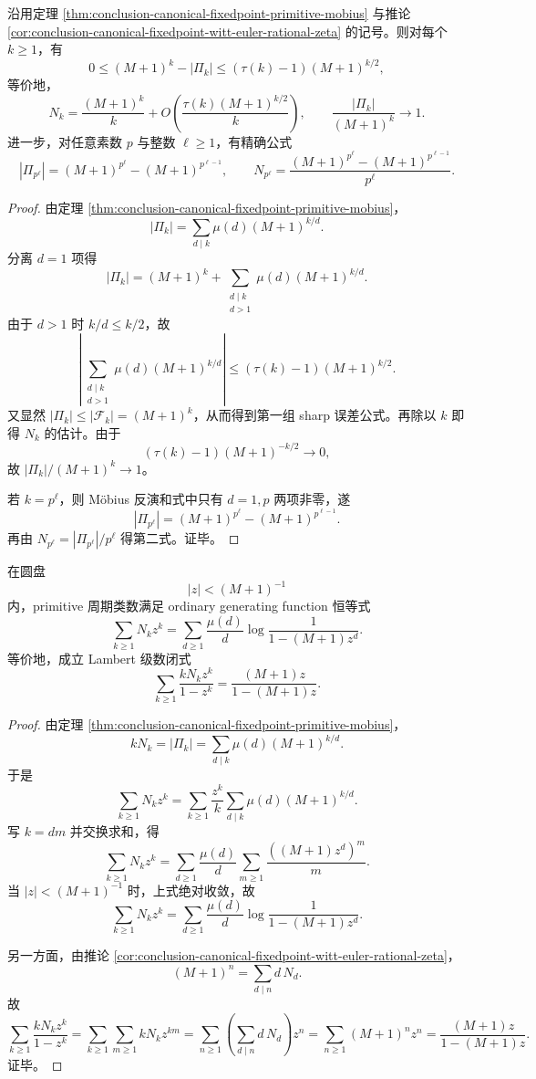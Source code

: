 \begin{theorem}\label{thm:conclusion-canonical-fixedpoint-primitive-sharp-error-primepower}
沿用定理 \ref{thm:conclusion-canonical-fixedpoint-primitive-mobius} 与推论 \ref{cor:conclusion-canonical-fixedpoint-witt-euler-rational-zeta} 的记号。则对每个 \(k\ge 1\)，有
\[
0\le (M+1)^k-|\Pi_k|
\le (\tau(k)-1)(M+1)^{k/2},
\]
等价地，
\[
N_k=\frac{(M+1)^k}{k}
+O\!\left(\frac{\tau(k)(M+1)^{k/2}}{k}\right),
\qquad
\frac{|\Pi_k|}{(M+1)^k}\longrightarrow 1.
\]
进一步，对任意素数 \(p\) 与整数 \(\ell\ge 1\)，有精确公式
\[
|\Pi_{p^\ell}|=(M+1)^{p^\ell}-(M+1)^{p^{\ell-1}},
\qquad
N_{p^\ell}=\frac{(M+1)^{p^\ell}-(M+1)^{p^{\ell-1}}}{p^\ell}.
\]
\end{theorem}
\begin{proof}
由定理 \ref{thm:conclusion-canonical-fixedpoint-primitive-mobius}，
\[
|\Pi_k|=\sum_{d\mid k}\mu(d)(M+1)^{k/d}.
\]
分离 \(d=1\) 项得
\[
|\Pi_k|
=(M+1)^k+\sum_{\substack{d\mid k\\ d>1}}\mu(d)(M+1)^{k/d}.
\]
由于 \(d>1\) 时 \(k/d\le k/2\)，故
\[
\left|
\sum_{\substack{d\mid k\\ d>1}}\mu(d)(M+1)^{k/d}
\right|
\le (\tau(k)-1)(M+1)^{k/2}.
\]
又显然 \(|\Pi_k|\le |\mathcal F_k|=(M+1)^k\)，从而得到第一组 sharp 误差公式。再除以 \(k\) 即得 \(N_k\) 的估计。由于
\[
(\tau(k)-1)(M+1)^{-k/2}\to 0,
\]
故 \(|\Pi_k|/(M+1)^k\to 1\)。

若 \(k=p^\ell\)，则 Möbius 反演和式中只有 \(d=1,p\) 两项非零，遂
\[
|\Pi_{p^\ell}|=(M+1)^{p^\ell}-(M+1)^{p^{\ell-1}}.
\]
再由 \(N_{p^\ell}=|\Pi_{p^\ell}|/p^\ell\) 得第二式。证毕。
\end{proof}

\begin{corollary}\label{cor:conclusion-canonical-fixedpoint-lambert-witt-series}
在圆盘
\[
|z|<(M+1)^{-1}
\]
内，primitive 周期类数满足 ordinary generating function 恒等式
\[
\sum_{k\ge 1}N_k z^k
=
\sum_{d\ge 1}\frac{\mu(d)}{d}\log\frac{1}{1-(M+1)z^d}.
\]
等价地，成立 Lambert 级数闭式
\[
\sum_{k\ge 1}\frac{kN_k z^k}{1-z^k}
=
\frac{(M+1)z}{1-(M+1)z}.
\]
\end{corollary}
\begin{proof}
由定理 \ref{thm:conclusion-canonical-fixedpoint-primitive-mobius}，
\[
kN_k=|\Pi_k|=\sum_{d\mid k}\mu(d)(M+1)^{k/d}.
\]
于是
\[
\sum_{k\ge 1}N_k z^k
=
\sum_{k\ge 1}\frac{z^k}{k}\sum_{d\mid k}\mu(d)(M+1)^{k/d}.
\]
写 \(k=dm\) 并交换求和，得
\[
\sum_{k\ge 1}N_k z^k
=
\sum_{d\ge 1}\frac{\mu(d)}{d}\sum_{m\ge 1}\frac{((M+1)z^d)^m}{m}.
\]
当 \(|z|<(M+1)^{-1}\) 时，上式绝对收敛，故
\[
\sum_{k\ge 1}N_k z^k
=
\sum_{d\ge 1}\frac{\mu(d)}{d}\log\frac{1}{1-(M+1)z^d}.
\]

另一方面，由推论 \ref{cor:conclusion-canonical-fixedpoint-witt-euler-rational-zeta}，
\[
(M+1)^n=\sum_{d\mid n}d\,N_d.
\]
故
\[
\sum_{k\ge 1}\frac{kN_k z^k}{1-z^k}
=
\sum_{k\ge 1}\sum_{m\ge 1}kN_k z^{km}
=
\sum_{n\ge 1}\left(\sum_{d\mid n}d\,N_d\right)z^n
=
\sum_{n\ge 1}(M+1)^n z^n
=
\frac{(M+1)z}{1-(M+1)z}.
\]
证毕。
\end{proof}
